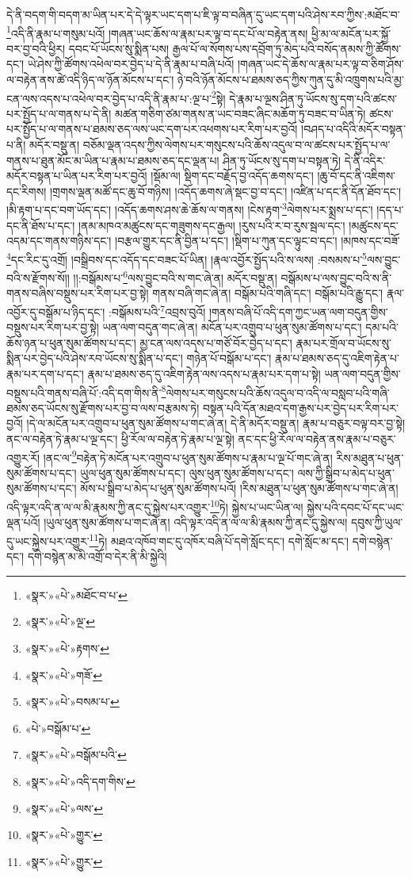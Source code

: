 དེ་ནི་བདག་གི་བདག་མ་ཡིན་པར་དེ་དེ་ལྟར་ཡང་དག་པ་ཇི་ལྟ་བ་བཞིན་དུ་ཡང་དག་པའི་ཤེས་རབ་ཀྱིས་:མཐོང་བ་\footnote{«སྣར་»«པེ་»མཐོང་བ་པ་}འདི་ནི་རྣམ་པ་གསུམ་པའོ། །གཞན་ཡང་ཆོས་ལ་རྣམ་པར་ལྟ་བ་དང་པོ་ལ་བརྟེན་ནས། ཕྱི་མ་ལ་མངོན་པར་སྐྱོ་བར་བྱ་བའི་ཕྱིར། དབང་པོ་ཡོངས་སུ་སྨིན་པས། རྒྱལ་པོ་ལ་སོགས་པས་དབྲོག་ཏུ་མེད་པའི་བསོད་ནམས་ཀྱི་ཚོགས་དང་། ཡེ་ཤེས་ཀྱི་ཚོགས་འཕེལ་བར་བྱེད་པ་དེ་ནི་རྣམ་པ་བཞི་པའོ། །གཞན་ཡང་དེ་ཆོས་ལ་རྣམ་པར་ལྟ་བ་ཅིག་ཤོས་ལ་བརྟེན་ནས་ཚེ་འདི་ཉིད་ལ་ཉོན་མོངས་པ་དང་། ཉེ་བའི་ཉོན་མོངས་པ་ཐམས་ཅད་ཀྱིས་ཀུན་དུ་མི་འཁྲུགས་པའི་མྱ་ངན་ལས་འདས་པ་འཕེལ་བར་བྱེད་པ་འདི་ནི་རྣམ་པ་:ལྔ་པ་\footnote{«སྣར་»«པེ་»ལྔ་}སྟེ། དེ་རྣམ་པ་ལྔས་ཤིན་ཏུ་ཡོངས་སུ་དག་པའི་ཚངས་པར་སྤྱོད་པ་ལ་གནས་པ་དེ་ནི། མཚན་གཅིག་ཙམ་གནས་ན་ཡང་བཟང་ཞིང་མཆོག་ཏུ་བཟང་བ་ཡིན་ཏེ། ཚངས་པར་སྤྱོད་པ་ལ་གནས་པ་ཐམས་ཅད་ལས་ཡང་དག་པར་འཕགས་པར་རིག་པར་བྱའོ། །བཤད་པ་འདིའི་མདོར་བསྟན་པ་ནི། མདོར་བསྡུ་ན། བཅོམ་ལྡན་འདས་ཀྱིས་ལེགས་པར་གསུངས་པའི་ཆོས་འདུལ་བ་ལ་ཚངས་པར་སྤྱོད་པ་ལ་གནས་པ་ཐུན་མོང་མ་ཡིན་པ་རྣམ་པ་ཐམས་ཅད་དང་ལྡན་པ། ཤིན་ཏུ་ཡོངས་སུ་དག་པ་བསྟན་ཏེ། དེ་ནི་འདིར་མདོར་བསྟན་པ་ཡིན་པར་རིག་པར་བྱའོ། །སྡོམ་ལ། སྡིག་དང་བརྗོད་བྱ་འདོད་ཆགས་དང་། །ཆུ་བོ་དང་ནི་འཇིགས་དང་རིགས། །གྲགས་ལྡན་མཚོ་དང་ཆུ་བོ་གཉིས། །འདོད་ཆགས་ཞེ་སྡང་བྱ་བ་དང་། །འཛིན་པ་དང་ནི་དོན་ཐོབ་དང་། །མི་རྟག་པ་དང་བག་ཡོད་དང་། །འདོད་ཆགས་ཤས་ཆེ་ཆོས་ལ་གནས། །ངེས་རྟག་\footnote{«སྣར་»«པེ་»རྟགས་}ལེགས་པར་སྨྲས་པ་དང་། །དད་པ་དང་ནི་ཐོས་པ་དང་། །ནམ་མཁའ་མཚུངས་དང་གཟུགས་དང་རྒྱལ། །རུས་པའི་ར་བ་རུས་སྦལ་དང་། །མཚུངས་དང་འདམ་དང་གནས་གཉིས་དང་། །བརྩལ་གྱུར་དང་ནི་བྱིན་པ་དང་། །སྡིག་པ་ཀུན་དང་ལྟུང་བ་དང་། །མཁས་དང་བཟོ་\footnote{«སྣར་»«པེ་»གཟོ་}དང་རིང་དུ་འགྲོ། །བསྒྲིབས་དང་འདོད་དང་བཟང་པོ་ཡིན། །རྣལ་འབྱོར་སྤྱོད་པའི་ས་ལས། :བསམས་པ་\footnote{«སྣར་»«པེ་»བསམ་པ་}ལས་བྱུང་བའི་ས་རྫོགས་སོ།། །།:བསྒོམས་པ་\footnote{«པེ་»བསྒོམ་པ་}ལས་བྱུང་བའི་ས་གང་ཞེ་ན། མདོར་བསྡུ་ན། བསྒོམས་པ་ལས་བྱུང་བའི་ས་ནི་གནས་བཞིས་བསྡུས་པར་རིག་པར་བྱ་སྟེ། གནས་བཞི་གང་ཞེ་ན། བསྒོམ་པའི་གཞི་དང་། བསྒོམ་པའི་རྒྱུ་དང་། རྣལ་འབྱོར་དུ་བསྒོམ་པ་ཉིད་དང་། :བསྒོམས་པའི་\footnote{«སྣར་»«པེ་»བསྒོམ་པའི་}འབྲས་བུའོ། །གནས་བཞི་པོ་འདི་དག་ཀྱང་ཡན་ལག་བདུན་གྱིས་བསྡུས་པར་རིག་པར་བྱ་སྟེ། ཡན་ལག་བདུན་གང་ཞེ་ན། མངོན་པར་འགྲུབ་པ་ཕུན་སུམ་ཚོགས་པ་དང་། དམ་པའི་ཆོས་ཉན་པ་ཕུན་སུམ་ཚོགས་པ་དང་། མྱ་ངན་ལས་འདས་པ་གཙོ་བོར་བྱེད་པ་དང་། རྣམ་པར་གྲོལ་བ་ཡོངས་སུ་སྨིན་པར་བྱེད་པའི་ཤེས་རབ་ཡོངས་སུ་སྨིན་པ་དང་། གཉེན་པོ་བསྒོམ་པ་དང་། རྣམ་པ་ཐམས་ཅད་དུ་འཇིག་རྟེན་པ་རྣམ་པར་དག་པ་དང་། རྣམ་པ་ཐམས་ཅད་དུ་འཇིག་རྟེན་ལས་འདས་པ་རྣམ་པར་དག་པ་སྟེ། ཡན་ལག་བདུན་གྱིས་བསྡུས་པའི་གནས་བཞི་པོ་:འདི་དག་གིས་ནི་\footnote{«སྣར་»«པེ་»འདི་དག་གིས་}ལེགས་པར་གསུངས་པའི་ཆོས་འདུལ་བ་འདི་ལ་བསླབ་པའི་གཞི་ཐམས་ཅད་ཡོངས་སུ་རྫོགས་པར་བྱ་བ་ལས་བརྩམས་ཏེ། བསྟན་པའི་དོན་མཐའ་དག་རྒྱས་པར་བྱེད་པར་རིག་པར་བྱའོ། །དེ་ལ་མངོན་པར་འགྲུབ་པ་ཕུན་སུམ་ཚོགས་པ་གང་ཞེ་ན། དེ་ནི་མདོར་བསྡུ་ན། རྣམ་པ་བཅུར་བལྟ་བར་བྱ་སྟེ། ནང་ལ་བརྟེན་ཏེ་རྣམ་པ་ལྔ་དང་། ཕྱི་རོལ་ལ་བརྟེན་ཏེ་རྣམ་པ་ལྔ་སྟེ། ནང་དང་ཕྱི་རོལ་ལ་བརྟེན་ནས་རྣམ་པ་བཅུར་འགྱུར་རོ། །ནང་ལ་\footnote{«སྣར་»«པེ་»ལས་}བརྟེན་ཏེ་མངོན་པར་འགྲུབ་པ་ཕུན་སུམ་ཚོགས་པ་རྣམ་པ་ལྔ་པོ་གང་ཞེ་ན། རིས་མཐུན་པ་ཕུན་སུམ་ཚོགས་པ་དང་། ཡུལ་ཕུན་སུམ་ཚོགས་པ་དང་། ལུས་ཕུན་སུམ་ཚོགས་པ་དང་། ལས་ཀྱི་སྒྲིབ་པ་མེད་པ་ཕུན་སུམ་ཚོགས་པ་དང་། མོས་པ་སྒྲིབ་པ་མེད་པ་ཕུན་སུམ་ཚོགས་པའོ། །རིས་མཐུན་པ་ཕུན་སུམ་ཚོགས་པ་གང་ཞེ་ན། འདི་ལྟར་འདི་ན་ལ་ལ་མི་རྣམས་ཀྱི་ནང་དུ་སྐྱེས་པར་འགྱུར་\footnote{«སྣར་»«པེ་»གྱུར་}ཏེ། སྐྱེས་པ་ཡང་ཡིན་ལ། སྐྱེས་པའི་དབང་པོ་དང་ཡང་ལྡན་པའོ། །ཡུལ་ཕུན་སུམ་ཚོགས་པ་གང་ཞེ་ན། འདི་ལྟར་འདི་ན་ལ་ལ་མི་རྣམས་ཀྱི་ནང་དུ་སྐྱེས་ལ། དབུས་ཀྱི་ཡུལ་དུ་ཡང་སྐྱེས་པར་འགྱུར་\footnote{«སྣར་»«པེ་»གྱུར་}ཏེ། མཐའ་འཁོབ་གང་དུ་འཁོར་བཞི་པོ་དགེ་སློང་དང་། དགེ་སློང་མ་དང་། དགེ་བསྙེན་དང་། དགེ་བསྙེན་མ་མི་འགྲོ་བ་དེར་ནི་མི་སྐྱེའི། 